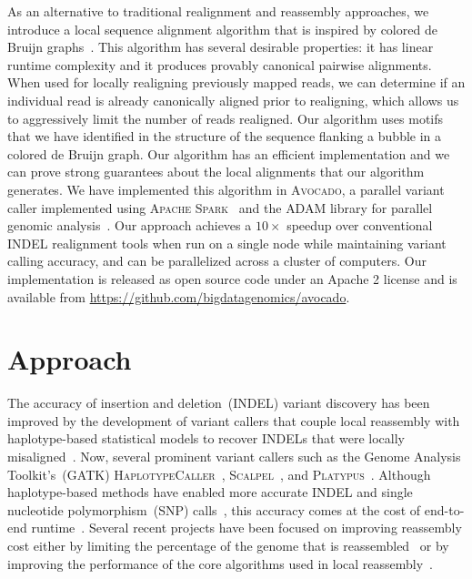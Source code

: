 \documentclass{bioinfo}
\begin{document}
As an alternative to traditional realignment and reassembly approaches, we
introduce a local sequence alignment algorithm that is inspired by colored de
Bruijn graphs~\citep{iqbal12}. This algorithm has several desirable properties:
it has linear runtime complexity and it produces provably canonical pairwise
alignments. When used for locally realigning previously mapped reads, we can
determine if an individual read is already canonically aligned prior to
realigning, which allows us to aggressively limit the number of reads realigned.
Our algorithm uses motifs that we have identified in the structure of the
sequence flanking a bubble in a colored de Bruijn graph. Our algorithm has an
efficient implementation and we can prove strong guarantees about the local
alignments that our algorithm generates. We have implemented this algorithm in
\textsc{Avocado}, a parallel variant caller implemented using \textsc{Apache
Spark}~\citep{zaharia12, zaharia10} and the \textsc{ADAM} library for parallel
genomic analysis~\citep{massie13, nothaft15}. Our approach achieves a $10\times$
speedup over conventional INDEL realignment tools when run on a single node
while maintaining variant calling accuracy, and can be parallelized across a
cluster of computers. Our implementation is released as open source code under
an Apache 2 license and is available from
\url{https://github.com/bigdatagenomics/avocado}.

\section{Approach}

The accuracy of insertion and deletion~(INDEL) variant discovery has been improved by the development
of variant callers that couple local reassembly with haplotype-based statistical models to recover INDELs
that were locally misaligned~\citep{albers11}. Now, several prominent variant callers such as the Genome
Analysis Toolkit's~(GATK) \textsc{HaplotypeCaller}~\citep{depristo11}, \textsc{Scalpel}~\citep{narzisi14}, and
\textsc{Platypus}~\citep{rimmer14}. Although haplotype-based methods have enabled more accurate INDEL
and single nucleotide polymorphism~(SNP) calls~\citep{bao14}, this accuracy comes at the cost of
end-to-end runtime~\citep{talwalkar14}. Several recent projects have been focused on improving
reassembly cost either by limiting the percentage of the genome that is reassembled~\citep{bloniarz14} or
by improving the performance of the core algorithms used in local reassembly~\citep{rimmer14}.
\end{document}
